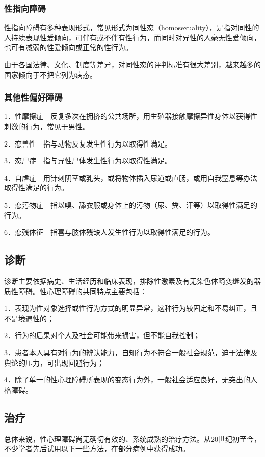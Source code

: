 \subsubsection{性指向障碍}

性指向障碍有多种表现形式，常见形式为同性恋（homosexuality），是指对同性的人持续表现性爱倾向，可伴有或不伴有性行为，而同时对异性的人毫无性爱倾向，也可有减弱的性爱倾向或正常的性行为。

由于各国法律、文化、制度等差异，对同性恋的评判标准有很大差别，越来越多的国家倾向于不把它列为病态。

\subsubsection{其他性偏好障碍}

1．性摩擦症　反复多次在拥挤的公共场所，用生殖器接触摩擦异性身体以获得性刺激的行为，常见于男性。

2．恋兽性　指与动物反复发生性行为以取得性满足。

3．恋尸症　指与异性尸体发生性行为以取得性满足。

4．自虐症　用针刺阴茎或乳头，或将物体插入尿道或直肠，或用自我窒息等办法取得性满足的行为。

5．恋污物症　指以嗅、舔衣服或身体上的污物（尿、粪、汗等）以取得性满足的行为。

6．恋残体征　指喜与肢体残缺人发生性行为以取得性满足的行为。

\subsection{诊断}

诊断主要依据病史、生活经历和临床表现，排除性激素及有无染色体畸变继发的器质性障碍。性心理障碍的共同特点主要包括：

1．表现为性对象选择或性行为方式的明显异常，这种行为较固定和不易纠正，且不是境遇性的；

2．行为的后果对个人及社会可能带来损害，但不能自我控制；

3．患者本人具有对行为的辨认能力，自知行为不符合一般社会规范，迫于法律及舆论的压力，可出现回避行为；

4．除了单一的性心理障碍所表现的变态行为外，一般社会适应良好，无突出的人格障碍。

\subsection{治疗}

总体来说，性心理障碍尚无确切有效的、系统成熟的治疗方法。从20世纪初至今，不少学者先后试用以下一些方法，在部分病例中获得成功。


